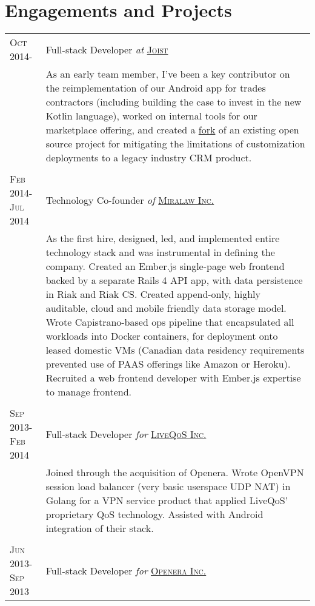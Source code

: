 \documentclass[letterpaper,10pt]{article}
\begin{document}
\section{Engagements and Projects}
\begin{longtable}{p{3cm}|p{12cm}}
  \textsc{Oct 2014-} & Full-stack Developer \emph{at} \href{https://www.joist.com/}{\textsc{Joist}} \\
   & \footnotesize{As an early team member, I've been a key contributor on the reimplementation of our Android app for trades contractors (including building the case to invest in the new Kotlin language), worked on internal tools for our marketplace offering, and created a \href{http://github.com/joist-engineering/force}{fork} of an existing open source project for mitigating the limitations of customization deployments to a legacy industry CRM product.} \\
\multicolumn{2}{c}{} \\
  \textsc{Feb 2014-Jul 2014} & Technology Co-founder \emph{of} \href{http://www.miralaw.ca/}{\textsc{Miralaw Inc.}} \\
   & \footnotesize{As the first hire, designed, led, and implemented entire technology stack and was instrumental in defining the company.  Created an Ember.js single-page web frontend backed by a separate Rails 4 API app, with data persistence in Riak and Riak CS.  Created append-only, highly auditable, cloud and mobile friendly data storage model.  Wrote Capistrano-based ops pipeline that encapsulated all workloads into Docker containers, for deployment onto leased domestic VMs (Canadian data residency requirements prevented use of PAAS offerings like Amazon or Heroku).  Recruited a web frontend developer with Ember.js expertise to manage frontend.} \\
\pagebreak
\multicolumn{2}{c}{} \\
  \textsc{Sep 2013-Feb 2014} & Full-stack Developer \emph{for} \href{http://www.liveqos.com/}{\textsc{LiveQoS Inc.}} \\
   & \footnotesize{Joined through the acquisition of Openera.  Wrote OpenVPN session load balancer (very basic userspace UDP NAT) in Golang for a VPN service product that applied LiveQoS' proprietary QoS technology.  Assisted with Android integration of their stack.} \\
\multicolumn{2}{c}{} \\
  \textsc{Jun 2013-Sep 2013} & Full-stack Developer \emph{for} \href{http://www.openera.com/}{\textsc{Openera Inc.}} \\

\end{longtable}
\end{document}
